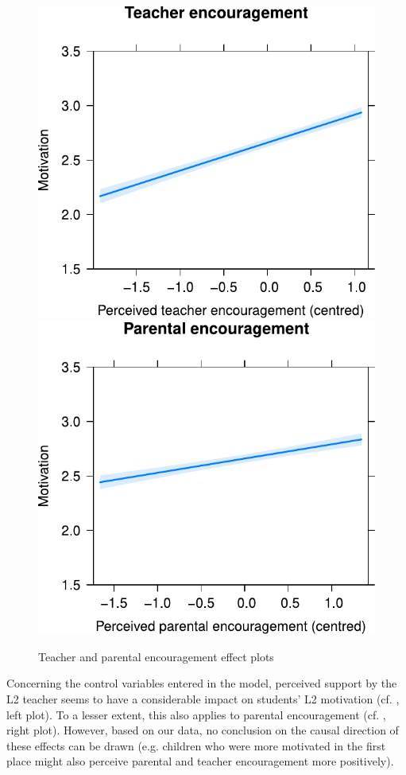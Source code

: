 \documentclass[output=paper]{langsci/langscibook}
\begin{document}
\begin{figure}
\includegraphics[width=.45\textwidth]{figures/Fig7.3.1.pdf}\hfill%
\includegraphics[width=.45\textwidth]{figures/Fig7.3.2.pdf}
\caption{Teacher and parental encouragement effect plots\label{fig:07:3}}
\end{figure}

Concerning the control variables entered in the model, perceived support by the L2 teacher seems to have a considerable impact on students’ L2 motivation (cf. , left plot). To a lesser extent, this also applies to parental encouragement (cf. , right plot). However, based on our data, no conclusion on the causal direction of these effects can be drawn (e.g. children who were more motivated in the first place might also perceive parental and teacher encouragement more positively).
\end{document}
